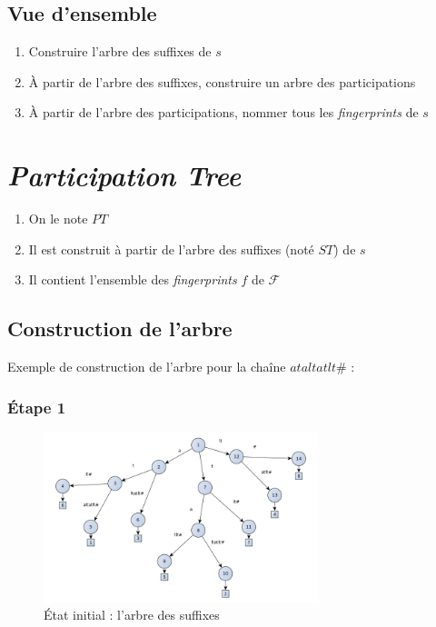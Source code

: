 \documentclass[a4paper]{article}
\begin{document}
\subsection{Vue d'ensemble}
	
\begin{enumerate}
	\item Construire l'arbre des suffixes de $s$
	\item À partir de l'arbre des suffixes, construire un arbre des participations
	\item À partir de l'arbre des participations, nommer tous les \textit{fingerprints} de $s$
\end{enumerate}

\section{\textit{Participation Tree}}

\begin{enumerate}
	\item On le note $PT$
	\item Il est construit à partir de l'arbre des suffixes (noté $ST$) de $s$
	\item Il contient l'ensemble des \emph{fingerprints} $f$ de $\mathcal{F}$
\end{enumerate}

\subsection{Construction de l'arbre}

Exemple de construction de l'arbre pour la chaîne $ataltatlt\#$ :

\subsubsection{Étape 1}

\begin{figure}[H]
\centering
\includegraphics[width=80mm]{./slides/img/construction-0.png}
\caption{État initial : l'arbre des suffixes}
\label{overflow}
\end{figure}
\end{document}
